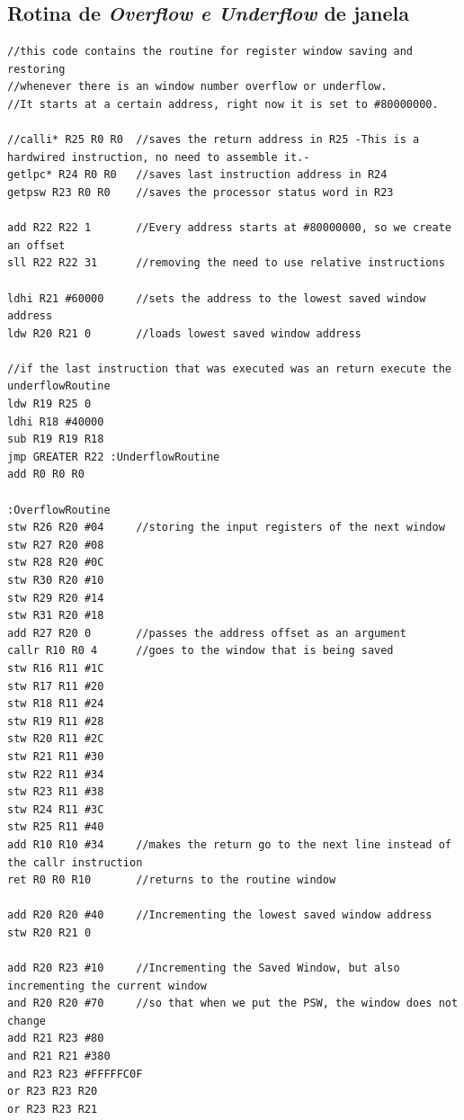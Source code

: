 \documentclass[
	article,			%
	11pt,				%
	oneside,			%
	a4paper,			%
	english,			%
	brazil,				%
	sumario=tradicional
	]{abntex2}
\begin{document}
\anexos
\begin{anexosenv}

\chapter{Rotina de \textit{Overflow e Underflow} de janela}

\begin{verbatim}
//this code contains the routine for register window saving and restoring 
//whenever there is an window number overflow or underflow.
//It starts at a certain address, right now it is set to #80000000.

//calli* R25 R0 R0	//saves the return address in R25 -This is a hardwired instruction, no need to assemble it.-
getlpc* R24 R0 R0	//saves last instruction address in R24
getpsw R23 R0 R0	//saves the processor status word in R23

add R22 R22 1		//Every address starts at #80000000, so we create an offset 
sll R22 R22 31		//removing the need to use relative instructions

ldhi R21 #60000     //sets the address to the lowest saved window address
ldw R20 R21 0       //loads lowest saved window address					

//if the last instruction that was executed was an return execute the underflowRoutine
ldw R19 R25 0
ldhi R18 #40000
sub R19 R19 R18
jmp GREATER R22 :UnderflowRoutine	
add R0 R0 R0

:OverflowRoutine
stw R26 R20 #04 	//storing the input registers of the next window
stw R27 R20 #08
stw R28 R20 #0C
stw R30 R20 #10
stw R29 R20 #14
stw R31 R20 #18
add R27 R20 0		//passes the address offset as an argument
callr R10 R0 4		//goes to the window that is being saved
stw R16 R11 #1C
stw R17 R11 #20
stw R18 R11 #24
stw R19 R11 #28
stw R20 R11 #2C
stw R21 R11 #30
stw R22 R11 #34
stw R23 R11 #38
stw R24 R11 #3C
stw R25 R11 #40
add R10 R10 #34     //makes the return go to the next line instead of the callr instruction
ret R0 R0 R10		//returns to the routine window

add R20 R20 #40		//Incrementing the lowest saved window address
stw R20 R21 0

add R20 R23 #10	    //Incrementing the Saved Window, but also incrementing the current window
and R20 R20 #70     //so that when we put the PSW, the window does not change
add R21 R23 #80   
and R21 R21 #380 
and R23 R23 #FFFFFC0F
or R23 R23 R20
or R23 R23 R21


\end{verbatim}
\end{anexosenv}
\end{document}
